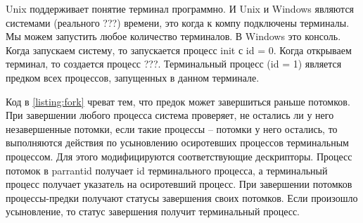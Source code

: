 Unix поддерживает понятие терминал программно. И Unix и Windows являются системами (реального ???) времени, это когда к компу подключены терминалы. Мы можем запустить любое количество терминалов. В Windows это консоль. 
Когда запускаем систему, то запускается процесс init с id = 0. Когда открываем терминал, то создается процесс ???. Терминальный процесс (id = 1) является предком всех процессов, запущенных в данном терминале. 

Код в \ref{listing:fork} чреват тем, что предок может завершиться раньше потомков.  При завершении любого процесса система проверяет, не остались ли у него незавершенные потомки, если такие процессы – потомки у него остались, то выполняются действия по усыновлению осиротевших процессов терминальным процессом. Для этого модифицируются соответствующие дескрипторы. Процесс потомок в parrantid получает id терминального процесса, а терминальный процесс получает указатель на осиротевший процесс. При завершении потомков процессы-предки получают статусы завершения своих потомков. Если произошло усыновление, то статус завершения получит терминальный процесс. 